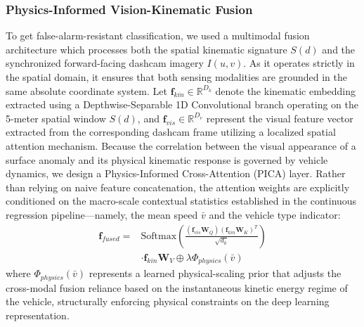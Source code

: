 \documentclass[conference]{IEEEtran}
\begin{document}
\subsubsection{Physics-Informed Vision-Kinematic Fusion}
To get false-alarm-resistant classification, we used a multimodal fusion architecture which processes both the spatial kinematic signature $S(d)$ and the synchronized forward-facing dashcam imagery $I(u, v)$.
As it operates strictly in the spatial domain, it ensures that both sensing modalities are grounded in the same absolute coordinate system.
Let $\mathbf{f}_{kin} \in \mathbb{R}^{D_k}$ denote the kinematic embedding extracted using a Depthwise-Separable 1D Convolutional branch operating on the 5-meter spatial window $S(d)$, and $\mathbf{f}_{vis} \in \mathbb{R}^{D_v}$ represent the visual feature vector extracted from the corresponding dashcam frame utilizing a localized spatial attention mechanism.
Because the correlation between the visual appearance of a surface anomaly and its physical kinematic response is governed by vehicle dynamics, we design a Physics-Informed Cross-Attention (PICA) layer.
Rather than relying on naive feature concatenation, the attention weights are explicitly conditioned on the macro-scale contextual statistics established in the continuous regression pipeline---namely, the mean speed $\bar{v}$ and the vehicle type indicator:
\begin{equation}
\begin{split}
\mathbf{f}_{fused} = &\text{Softmax}\left( \frac{(\mathbf{f}_{vis}\mathbf{W}_Q)(\mathbf{f}_{kin}\mathbf{W}_K)^T}{\sqrt{d_k}} \right) \\
&\cdot \mathbf{f}_{kin}\mathbf{W}_V \oplus \lambda \Phi_{physics}(\bar{v})
\end{split}
\end{equation}
where $\Phi_{physics}(\bar{v})$ represents a learned physical-scaling prior that adjusts the cross-modal fusion reliance based on the instantaneous kinetic energy regime of the vehicle, structurally enforcing physical constraints on the deep learning representation.
\end{document}

